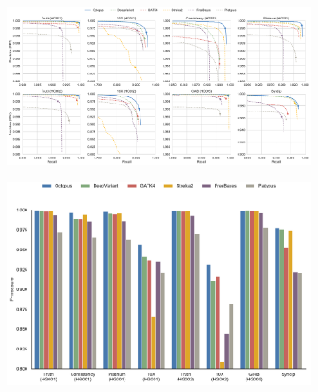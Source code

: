 \documentclass[notitlepage, twocolumn, 10pt]{article}
\begin{document}
\begin{figure}[ht!]
    \centering
    \vspace{-0.5cm}
\captionsetup[subfigure]{position=top,labelfont=bf,textfont=normalfont,singlelinecheck=off,justification=raggedright}
    \begin{subfigure}[b]{\textwidth}
        \caption{}
        \includegraphics[width=\textwidth]{figures/germline_precision_recalls}
        \label{fig:germline:precision-recall}
    \end{subfigure}
    \begin{subfigure}[b]{0.49\textwidth}
        \vspace{-0.5cm}
        \caption{}
        \includegraphics[width=\textwidth]{figures/F-Measures}
        \label{fig:germline:f-measure}
    \end{subfigure}
    \begin{subfigure}[b]{0.49\textwidth}
        \vspace{-0.5cm}
        \caption{}

\end{subfigure}
\end{figure}
\end{document}
